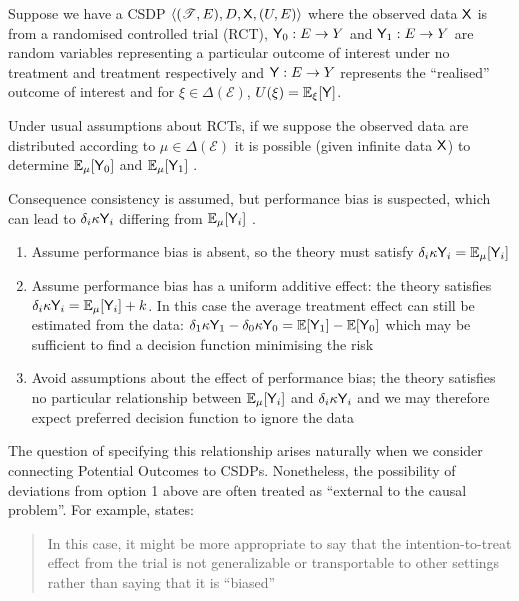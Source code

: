 \begin{example}\label{ex:nonst_distn}
Suppose we have a CSDP $\langle (\mathscr{T}, E), D, \mathsf{X}, (U,E) \rangle$ where the observed data $\mathsf{X}$ is from a randomised controlled trial (RCT), $\mathsf{Y}_0:E\to Y$ and $\mathsf{Y}_1:E\to Y$ are random variables representing a particular outcome of interest under no treatment and treatment respectively and $\mathsf{Y}:E\to Y$ represents the ``realised'' outcome of interest and for $\xi\in \Delta(\mathcal{E})$, $U(\xi) = \mathbb{E}_{\xi}[\mathsf{Y}]$. 

Under usual assumptions about RCTs, if we suppose the observed data are distributed according to $\mu \in \Delta(\mathcal{E})$ it is possible (given infinite data $\mathsf{X}$) to determine $\mathbb{E}_\mu[\mathsf{Y}_0]$ and $\mathbb{E}_\mu[\mathsf{Y}_1]$ \citep{rubin_causal_2005}.

Consequence consistency is assumed, but performance bias is suspected, which can lead to $\delta_i \kappa \mathsf{Y}_i$ differing from $\mathbb{E}_\mu[\mathsf{Y}_i]$ \citep{mansournia_biases_2017}.
\begin{enumerate}
    \item Assume performance bias is absent, so the theory must satisfy $\delta_i \kappa \mathsf{Y}_i = \mathbb{E}_\mu[\mathsf{Y}_i]$
    \item Assume performance bias has a uniform additive effect: the theory satisfies $\delta_i \kappa \mathsf{Y}_i = \mathbb{E}_\mu[\mathsf{Y}_i]+k$. In this case the average treatment effect can still be estimated from the data: $\delta_1 \kappa \mathsf{Y}_1 - \delta_0\kappa\mathsf{Y}_0 = \mathbb{E}[\mathsf{Y}_1]-\mathbb{E}[\mathsf{Y}_0]$ which may be sufficient to find a decision function minimising the risk
    \item Avoid assumptions about the effect of performance bias; the theory satisfies no particular relationship between $\mathbb{E}_\mu[\mathsf{Y}_i]$ and $\delta_i \kappa \mathsf{Y}_i$ and we may therefore expect preferred decision function to ignore the data
\end{enumerate}
The question of specifying this relationship arises naturally when we consider connecting Potential Outcomes to CSDPs. Nonetheless, the possibility of deviations from option 1 above are often treated as ``external to the causal problem''. For example,  \cite{mansournia_biases_2017} states:
\begin{quote}
    In this case, it might be more appropriate to say that the intention-to-treat effect from the trial is not generalizable or transportable to other settings rather than saying that it is “biased”
\end{quote}
\end{example}

